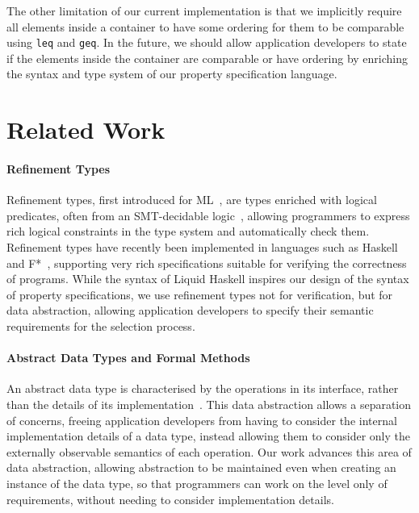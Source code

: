 The other limitation of our current implementation is that we implicitly require all elements inside a container to have some ordering for them to be comparable using \verb|leq| and \verb|geq|. In the future, we should allow application developers to state if the elements inside the container are comparable or have ordering by enriching the syntax and type system of our property specification language.

\section{Related Work}
\label{chap2:related-work}
\paragraph*{Refinement Types}
Refinement types, first introduced for ML~\citep{10.1145/113445.113468}, are types enriched with logical predicates, often from an SMT-decidable logic~\citep{10.1145/1863543.1863560}, allowing programmers to express 
rich logical constraints in the type system and automatically check them.
Refinement types have recently been implemented in languages such as Haskell~\citep{DBLP:conf/esop/VazouRJ13, 10.1145/2692915.2628161}
and F*~\citep{fstar}, supporting very rich specifications suitable for verifying the correctness of programs. 
While the syntax of Liquid Haskell inspires our design of the syntax of property specifications, we use refinement types not for verification, but for data abstraction, allowing application developers to specify their semantic requirements for the selection process.

\paragraph*{Abstract Data Types and Formal Methods}
An abstract data type is characterised by the operations in its interface, rather than the details of its implementation~\citep{10.1145/942572.807045}. 
This data abstraction allows a separation of concerns, freeing application developers from having to consider the internal implementation details of a data type, instead allowing them to consider only the externally observable 
semantics of each operation. Our work advances this area of data abstraction, allowing abstraction to be maintained even when creating an instance of the data type, so that programmers can work on the level only of requirements,
without needing to consider implementation details.

